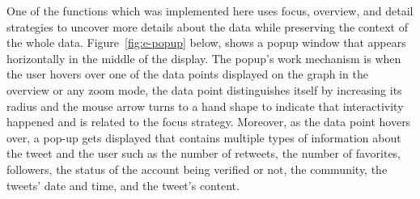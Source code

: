One of the functions which was implemented here uses focus, overview, and detail strategies to uncover more details about the data while preserving the context of the whole data. Figure~\ref{fig:e-popup} below, shows a popup window that appears horizontally in the middle of the display. The popup's work mechanism is when the user hovers over one of the data points displayed on the graph in the overview or any zoom mode, the data point distinguishes itself by increasing its radius and the mouse arrow turns to a hand shape to indicate that interactivity happened and is related to the focus strategy. Moreover, as the data point hovers over, a pop-up gets displayed that contains multiple types of information about the tweet and the user such as the number of retweets, the number of favorites, followers, the status of the account being verified or not, the community, the tweets' date and time, and the tweet's content. 

\\\


